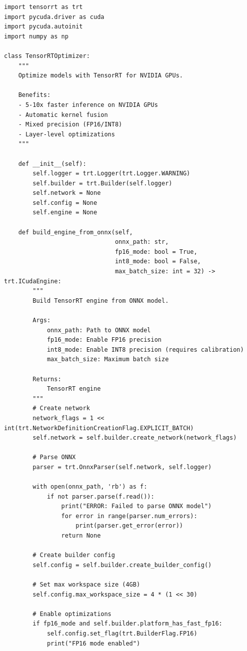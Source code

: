 \begin{lstlisting}[style=python, caption=TensorRT optimization for NVIDIA GPUs]
import tensorrt as trt
import pycuda.driver as cuda
import pycuda.autoinit
import numpy as np

class TensorRTOptimizer:
    """
    Optimize models with TensorRT for NVIDIA GPUs.

    Benefits:
    - 5-10x faster inference on NVIDIA GPUs
    - Automatic kernel fusion
    - Mixed precision (FP16/INT8)
    - Layer-level optimizations
    """

    def __init__(self):
        self.logger = trt.Logger(trt.Logger.WARNING)
        self.builder = trt.Builder(self.logger)
        self.network = None
        self.config = None
        self.engine = None

    def build_engine_from_onnx(self,
                               onnx_path: str,
                               fp16_mode: bool = True,
                               int8_mode: bool = False,
                               max_batch_size: int = 32) -> trt.ICudaEngine:
        """
        Build TensorRT engine from ONNX model.

        Args:
            onnx_path: Path to ONNX model
            fp16_mode: Enable FP16 precision
            int8_mode: Enable INT8 precision (requires calibration)
            max_batch_size: Maximum batch size

        Returns:
            TensorRT engine
        """
        # Create network
        network_flags = 1 << int(trt.NetworkDefinitionCreationFlag.EXPLICIT_BATCH)
        self.network = self.builder.create_network(network_flags)

        # Parse ONNX
        parser = trt.OnnxParser(self.network, self.logger)

        with open(onnx_path, 'rb') as f:
            if not parser.parse(f.read()):
                print("ERROR: Failed to parse ONNX model")
                for error in range(parser.num_errors):
                    print(parser.get_error(error))
                return None

        # Create builder config
        self.config = self.builder.create_builder_config()

        # Set max workspace size (4GB)
        self.config.max_workspace_size = 4 * (1 << 30)

        # Enable optimizations
        if fp16_mode and self.builder.platform_has_fast_fp16:
            self.config.set_flag(trt.BuilderFlag.FP16)
            print("FP16 mode enabled")


\end{lstlisting}

